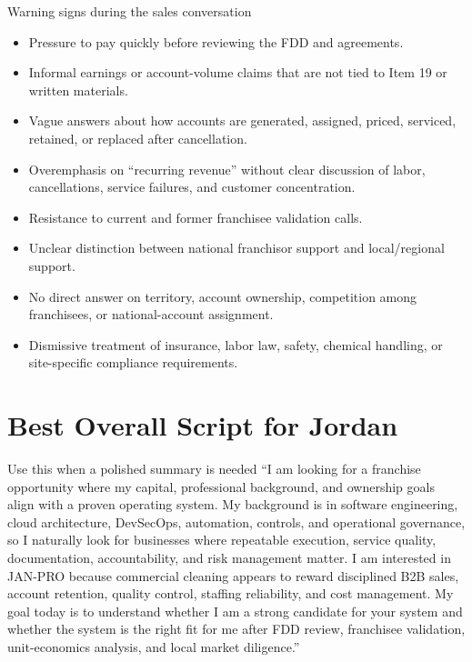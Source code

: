 \documentclass[11pt]{article}
\newcommand{\janpro}{JAN-PRO}
\begin{document}
\begin{warningbox}{Warning signs during the sales conversation}
\begin{itemize}
  \item Pressure to pay quickly before reviewing the FDD and agreements.
  \item Informal earnings or account-volume claims that are not tied to Item 19 or written materials.
  \item Vague answers about how accounts are generated, assigned, priced, serviced, retained, or replaced after cancellation.
  \item Overemphasis on ``recurring revenue'' without clear discussion of labor, cancellations, service failures, and customer concentration.
  \item Resistance to current and former franchisee validation calls.
  \item Unclear distinction between national franchisor support and local/regional support.
  \item No direct answer on territory, account ownership, competition among franchisees, or national-account assignment.
  \item Dismissive treatment of insurance, labor law, safety, chemical handling, or site-specific compliance requirements.
\end{itemize}
\end{warningbox}

\section{Best Overall Script for Jordan}

\begin{greenbox}{Use this when a polished summary is needed}
``I am looking for a franchise opportunity where my capital, professional background, and ownership goals align with a proven operating system. My background is in software engineering, cloud architecture, DevSecOps, automation, controls, and operational governance, so I naturally look for businesses where repeatable execution, service quality, documentation, accountability, and risk management matter. I am interested in \janpro{} because commercial cleaning appears to reward disciplined B2B sales, account retention, quality control, staffing reliability, and cost management. My goal today is to understand whether I am a strong candidate for your system and whether the system is the right fit for me after FDD review, franchisee validation, unit-economics analysis, and local market diligence.''
\end{greenbox}
\end{document}
